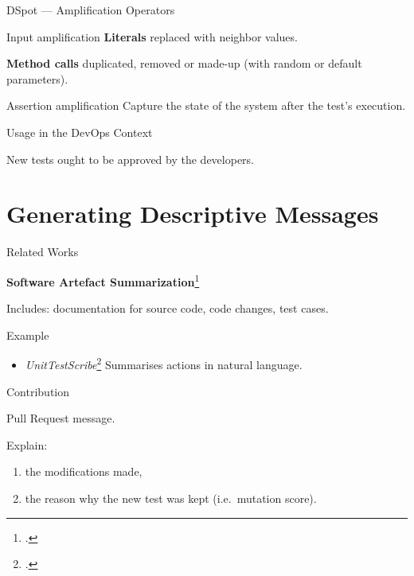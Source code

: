 \documentclass[aspectratio=169,dvipsnames]{beamer}
\begin{document}
\begin{frame}{DSpot --- Amplification Operators}
  \begin{block}{Input amplification}
    \textbf{Literals \textrightarrow{}} replaced with neighbor values.

    \textbf{Method calls \textrightarrow{}} duplicated, removed or made-up (with random or default parameters).
  \end{block}

  \vfill
  \pause{}

  \begin{block}{Assertion amplification}
    Capture the state of the system after the test's execution.
  \end{block}
\end{frame}

\begin{frame}{Usage in the DevOps Context}
  \begin{center}
    \alert{New tests ought to be approved by the developers.}
  \end{center}
\end{frame}


\section{Generating Descriptive Messages}

\begin{frame}{Related Works}
  \begin{center}
    \textbf{\Large{Software Artefact Summarization}}\footcite{nazar2016summarizing}
  \end{center}

  Includes: documentation for source code, code changes, \alert{test cases}.

  \vfill{}
  \pause{}

  \begin{block}{Example}
    \begin{itemize}
      \item<+-> \textit{UnitTestScribe}\footcite{li2016automatically} Summarises actions in natural language.
    \end{itemize}
  \end{block}
\end{frame}

\begin{frame}{Contribution}
  \begin{center}
    Pull Request message.
  \end{center}

  Explain:
  \begin{enumerate}
    \item the modifications made,
    \item the reason why the new test was kept (i.e.\ mutation score).
  \end{enumerate}
\end{frame}
\end{document}
